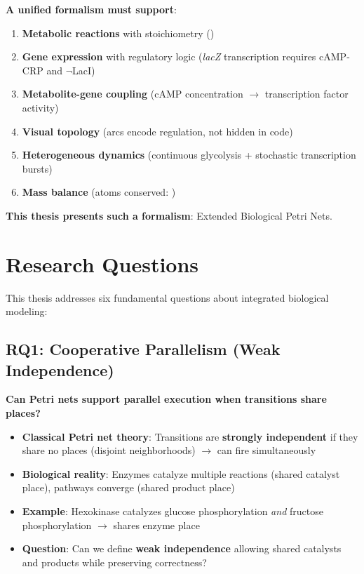 \textbf{A unified formalism must support}:

\begin{enumerate}
    \item \textbf{Metabolic reactions} with stoichiometry ()
    \item \textbf{Gene expression} with regulatory logic (\emph{lacZ} transcription requires cAMP-CRP and $\neg$LacI)
    \item \textbf{Metabolite-gene coupling} (cAMP concentration $\to$ transcription factor activity)
    \item \textbf{Visual topology} (arcs encode regulation, not hidden in code)
    \item \textbf{Heterogeneous dynamics} (continuous glycolysis + stochastic transcription bursts)
    \item \textbf{Mass balance} (atoms conserved: )
\end{enumerate}

\textbf{This thesis presents such a formalism}: Extended Biological Petri Nets.

\section{Research Questions}
\label{sec:research-questions}

This thesis addresses six fundamental questions about integrated biological modeling:

\subsection{RQ1: Cooperative Parallelism (Weak Independence)}
\label{subsec:rq1}

\textbf{Can Petri nets support parallel execution when transitions share places?}

\begin{itemize}
    \item \textbf{Classical Petri net theory}: Transitions are \textbf{strongly independent} if they share no places (disjoint neighborhoods) $\to$ can fire simultaneously
    \item \textbf{Biological reality}: Enzymes catalyze multiple reactions (shared catalyst place), pathways converge (shared product place)
    \item \textbf{Example}: Hexokinase catalyzes glucose phosphorylation \textit{and} fructose phosphorylation $\to$ shares enzyme place
    \item \textbf{Question}: Can we define \textbf{weak independence} allowing shared catalysts and products while preserving correctness?
\end{itemize}

